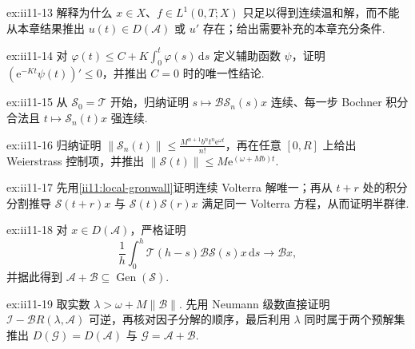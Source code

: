 \begin{FAExercise}[正则性边界警示]{ex:ii11-13}
解释为什么 \(\displaystyle x\in X\)、\(\displaystyle f\in L^1(0,T;X)\) 只足以得到连续温和解，而不能从本章结果推出 \(\displaystyle u(t)\in D(\mathcal A)\) 或 \(\displaystyle u'\) 存在；给出需要补充的本章充分条件.
\end{FAExercise}

\begin{FAExercise}[局部 Gronwall]{ex:ii11-14}
对 \(\displaystyle\varphi(t)\leqslant C+K\int_0^t\varphi(s)\,\mathrm{d}s\) 定义辅助函数 \(\displaystyle\psi\)，证明 \(\displaystyle(\mathrm{e}^{-Kt}\psi(t))'\leqslant0\)，并推出 \(\displaystyle C=0\) 时的唯一性结论.
\end{FAExercise}

\begin{FAExercise}{ex:ii11-15}
从 \(\displaystyle\mathcal S_0=\mathcal T\) 开始，归纳证明 \(\displaystyle s\mapsto\mathcal B\mathcal S_n(s)x\) 连续、每一步 Bochner 积分合法且 \(\displaystyle t\mapsto\mathcal S_n(t)x\) 强连续.
\end{FAExercise}

\begin{FAExercise}{ex:ii11-16}
归纳证明 \(\displaystyle\|\mathcal S_n(t)\|\leqslant \frac{M^{n+1}b^nt^n\mathrm{e}^{\omega t}}{n!}\)，再在任意 \(\displaystyle[0,R]\) 上给出 Weierstrass 控制项，并推出 \(\displaystyle\|\mathcal S(t)\|\leqslant M\mathrm{e}^{(\omega+Mb)t}\).
\end{FAExercise}

\begin{FAExercise}{ex:ii11-17}
先用\autoref{ii11:local-gronwall}证明连续 Volterra 解唯一；再从 \(\displaystyle t+r\) 处的积分分割推导 \(\displaystyle\mathcal S(t+r)x\) 与 \(\displaystyle\mathcal S(t)\mathcal S(r)x\) 满足同一 Volterra 方程，从而证明半群律.
\end{FAExercise}

\begin{FAExercise}[生成元的平均化扰动极限]{ex:ii11-18}
对 \(\displaystyle x\in D(\mathcal A)\)，严格证明
\[
\frac1h\int_0^h\mathcal T(h-s)\mathcal B\mathcal S(s)x\,\mathrm{d}s
\longrightarrow
\mathcal Bx,
\]
并据此得到 \(\displaystyle\mathcal A+\mathcal B\subseteq\operatorname{Gen}(\mathcal S)\).
\end{FAExercise}

\begin{FAExercise}[共同预解点与生成元精确等式]{ex:ii11-19}
取实数 \(\displaystyle\lambda>\omega+M\|\mathcal B\|\). 先用 Neumann 级数直接证明 \(\displaystyle\mathcal I-\mathcal BR(\lambda,\mathcal A)\) 可逆，再核对因子分解的顺序，最后利用 \(\displaystyle\lambda\) 同时属于两个预解集推出 \(\displaystyle D(\mathcal G)=D(\mathcal A)\) 与 \(\displaystyle\mathcal G=\mathcal A+\mathcal B\).
\end{FAExercise}

